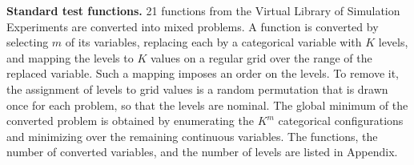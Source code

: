 \textbf{Standard test functions.} 21 functions from the Virtual Library of Simulation Experiments are converted into mixed problems. A function is converted by selecting $m$ of its variables, replacing each by a categorical variable with $K$ levels, and mapping the levels to $K$ values on a regular grid over the range of the replaced variable. Such a mapping imposes an order on the levels. To remove it, the assignment of levels to grid values is a random permutation that is drawn once for each problem, so that the levels are nominal. The global minimum of the converted problem is obtained by enumerating the $K^m$ categorical configurations and minimizing over the remaining continuous variables. The functions, the number of converted variables, and the number of levels are listed in Appendix.